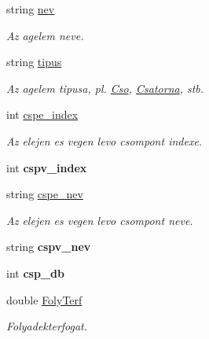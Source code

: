 \begin{DoxyCompactItemize}
string \hyperlink{class_agelem_abe92b7e3912367d5d1caf6b277ca0b7d}{nev}
\begin{DoxyCompactList}\small\item\em Az agelem neve. \end{DoxyCompactList}\item 
\mbox{\label{class_agelem_a6e1c3128174609a0dd8fbee09c0d9162}} 
string \hyperlink{class_agelem_a6e1c3128174609a0dd8fbee09c0d9162}{tipus}
\begin{DoxyCompactList}\small\item\em Az agelem tipusa, pl. \hyperlink{class_cso}{Cso}, \hyperlink{class_csatorna}{Csatorna}, stb. \end{DoxyCompactList}\item 
\mbox{\label{class_agelem_a9639c0a7a0165b644d62033e24eb6d24}} 
int \hyperlink{class_agelem_a9639c0a7a0165b644d62033e24eb6d24}{cspe\+\_\+index}
\begin{DoxyCompactList}\small\item\em Az elejen es vegen levo csompont indexe. \end{DoxyCompactList}\item 
\mbox{\label{class_agelem_a58103d621323b8cc243fa8e7e3afd15d}} 
int {\bfseries cspv\+\_\+index}
\item 
\mbox{\label{class_agelem_aba3d9c5d2eed320e7a0531e99188a73a}} 
string \hyperlink{class_agelem_aba3d9c5d2eed320e7a0531e99188a73a}{cspe\+\_\+nev}
\begin{DoxyCompactList}\small\item\em Az elejen es vegen levo csompont neve. \end{DoxyCompactList}\item 
\mbox{\label{class_agelem_ac637696905966c41ddc21c708c653991}} 
string {\bfseries cspv\+\_\+nev}
\item 
\mbox{\label{class_agelem_a2cf9ad5c8991d7bfc41754126a1a82f6}} 
int {\bfseries csp\+\_\+db}
\item 
\mbox{\label{class_agelem_ab235bccddd3f04b9f4e991ee8f3dd8ff}} 
double \hyperlink{class_agelem_ab235bccddd3f04b9f4e991ee8f3dd8ff}{Foly\+Terf}
\begin{DoxyCompactList}\small\item\em Folyadekterfogat. \end{DoxyCompactList}\item 

\end{DoxyCompactItemize}
